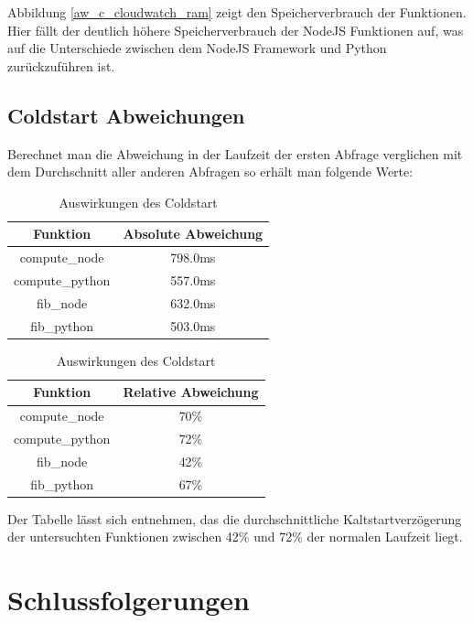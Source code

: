 \documentclass[12pt,a4paper,parskip=half]{scrreprt}
\begin{document}
Abbildung \ref{aw_c_cloudwatch_ram} zeigt den Speicherverbrauch der Funktionen. Hier fällt der deutlich höhere Speicherverbrauch der NodeJS Funktionen auf, was auf die Unterschiede zwischen dem NodeJS Framework und Python zurückzuführen ist.  

\newpage
\subsection{Coldstart Abweichungen}

Berechnet man die Abweichung in der Laufzeit der ersten Abfrage verglichen mit dem Durchschnitt aller anderen Abfragen so erhält man folgende Werte:
\\
\begin{table}[h!]
	\centering
	\begin{tabular}{||c c||} 
		\hline
		Funktion & Absolute Abweichung \\ [0.5ex] 
		\hline\hline
		compute\_node & 798.0ms \\
		compute\_python & 557.0ms \\
		fib\_node & 632.0ms \\
		fib\_python & 503.0ms \\ [1ex] 
		\hline
	\end{tabular}

	\vspace{1cm}

	\begin{tabular}{||c c||} 
		\hline
		Funktion & Relative Abweichung \\ [0.5ex] 
		\hline\hline
		compute\_node & 70\% \\
		compute\_python & 72\% \\
		fib\_node & 42\% \\
		fib\_python & 67\% \\ [1ex] 
		\hline
	\end{tabular}
	\caption{Auswirkungen des Coldstart}
	\label{table:2}
\end{table}

Der Tabelle lässt sich entnehmen, das die durchschnittliche Kaltstartverzögerung der untersuchten Funktionen zwischen 42\% und 72\% der normalen Laufzeit liegt.


\newpage
\section{Schlussfolgerungen}
\end{document}
